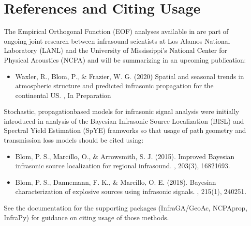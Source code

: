 \documentclass[letterpaper,10pt,english]{sphinxmanual}
\begin{document}
\section{References and Citing Usage}
\label{\detokenize{references:references-and-citing-usage}}\label{\detokenize{references:references}}\label{\detokenize{references::doc}}
The Empirical Orthogonal Function (EOF) analyses available in  are part of ongoing joint research between infrasound scientists at Los Alamos National Laboratory (LANL) and the University of Mississippi’s National Center for Physical Acoustics (NCPA) and will be summarizing in an upcoming publication:
\begin{itemize}
\item {} 
Waxler, R., Blom, P., \& Frazier, W. G. (2020) Spatial and seasonal trends in atmospheric structure and predicted infrasonic propagation for the continental US.  , In Preparation

\end{itemize}

Stochastic, propagation\sphinxhyphen{}based models for infrasonic signal analysis were initially introduced in analysis of the Bayesian Infrasonic Source Localization (BISL) and Spectral Yield Estimation (SpYE) framworks so that usage of path geometry and transmission loss models should be cited using:
\begin{itemize}
\item {} 
Blom, P. S., Marcillo, O., \& Arrowsmith, S. J. (2015). Improved Bayesian infrasonic source localization for regional infrasound. , 203(3), 1682\sphinxhyphen{}1693.

\item {} 
Blom, P. S., Dannemann, F. K., \& Marcillo, O. E. (2018). Bayesian characterization of explosive sources using infrasonic signals. , 215(1), 240\sphinxhyphen{}251.

\end{itemize}

See the documentation for the supporting packages (InfraGA/GeoAc, NCPAprop, InfraPy) for guidance on citing usage of those methods.


\renewcommand{\indexname}{Python Module Index}
\begin{sphinxtheindex}
\let\bigletter\sphinxstyleindexlettergroup
\bigletter{s}
\item\relax{}
\item\relax{}
\item\relax{}
\end{sphinxtheindex}

\renewcommand{\indexname}{Index}
\printindex
\end{document}

